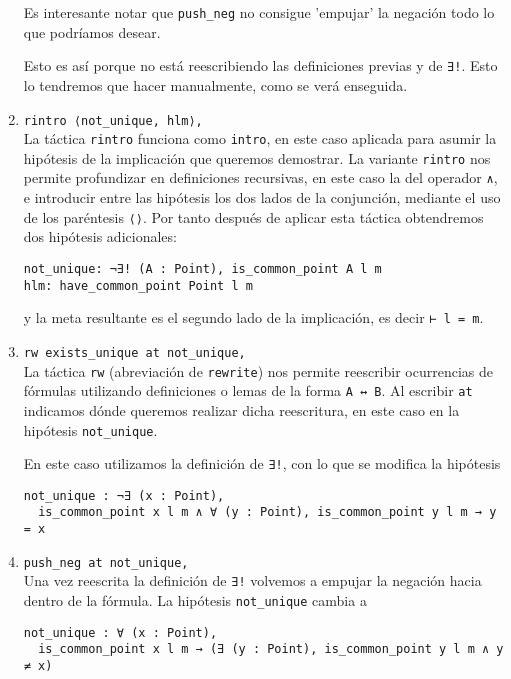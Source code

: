 \begin{enumerate}[label=L.\arabic*, topsep=0mm]
	      Es interesante notar que \lstinline{push_neg} no consigue 'empujar' la negación todo lo que podríamos desear.

	      Esto es así porque no está reescribiendo las definiciones previas y de
	      \lstinline{∃!}. Esto lo tendremos que hacer manualmente, como se verá
	      enseguida.

	\item \lstinline{rintro ⟨not_unique, hlm⟩,}\\[.5em] La táctica \lstinline{rintro}
	      funciona como \lstinline{intro}, en este caso aplicada para asumir la
	      hipótesis de la implicación que queremos demostrar. La variante
	      \lstinline{rintro} nos permite profundizar en definiciones recursivas, en este
	      caso la del operador \lstinline{∧}, e introducir entre las hipótesis
	      los dos lados de la conjunción, mediante el uso de los paréntesis
	      \lstinline{⟨⟩}. Por tanto después de aplicar esta táctica obtendremos dos
	      hipótesis adicionales:
	      \begin{lstlisting}
not_unique: ¬∃! (A : Point), is_common_point A l m
hlm: have_common_point Point l m
\end{lstlisting}
	      y la meta resultante es el segundo lado de la implicación, es decir
	      \lstinline{⊢ l = m}.

	\item \lstinline{rw exists_unique at not_unique,}\\[.5em] La táctica \lstinline{rw}
	      (abreviación de \lstinline{rewrite}) nos permite reescribir ocurrencias de
	      fórmulas utilizando definiciones o lemas de la forma \lstinline{A ↔ B}. Al
	      escribir \lstinline{at} indicamos dónde queremos realizar dicha
	      reescritura, en este caso en la hipótesis \lstinline{not_unique}.

	      En este caso utilizamos la definición de \lstinline{∃!}, con lo que se modifica la hipótesis
	      \begin{lstlisting}
not_unique : ¬∃ (x : Point), 
  is_common_point x l m ∧ ∀ (y : Point), is_common_point y l m → y = x
\end{lstlisting}

	\item \lstinline{push_neg at not_unique,}\\[.5em] Una vez reescrita la
	      definición de \lstinline{∃!} volvemos a empujar la negación hacia
	      dentro de la fórmula.
	      La hipótesis \lstinline{not_unique} cambia a
	      \begin{lstlisting}
not_unique : ∀ (x : Point), 
  is_common_point x l m → (∃ (y : Point), is_common_point y l m ∧ y ≠ x)
\end{lstlisting}


\end{enumerate}
